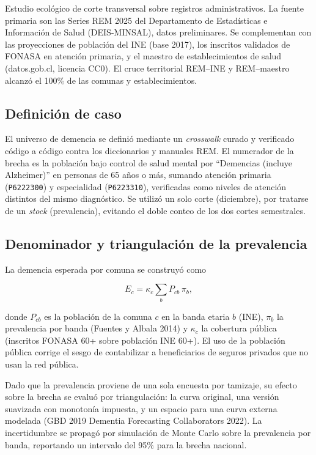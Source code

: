 \documentclass[
  spanish,
  letterpaper,
  DIV=11,
  numbers=noendperiod]{scrartcl}
\begin{document}
Estudio ecológico de corte transversal sobre registros administrativos.
La fuente primaria son las Series REM 2025 del Departamento de
Estadísticas e Información de Salud (DEIS-MINSAL), datos preliminares.
Se complementan con las proyecciones de población del INE (base 2017),
los inscritos validados de FONASA en atención primaria, y el maestro de
establecimientos de salud (datos.gob.cl, licencia CC0). El cruce
territorial REM--INE y REM--maestro alcanzó el 100\% de las comunas y
establecimientos.

\subsection{Definición de caso}\label{definiciuxf3n-de-caso}

El universo de demencia se definió mediante un \emph{crosswalk} curado y
verificado código a código contra los diccionarios y manuales REM. El
numerador de la brecha es la población bajo control de salud mental por
``Demencias (incluye Alzheimer)'' en personas de 65 años o más, sumando
atención primaria (\texttt{P6222300}) y especialidad
(\texttt{P6223310}), verificadas como niveles de atención distintos del
mismo diagnóstico. Se utilizó un solo corte (diciembre), por tratarse de
un \emph{stock} (prevalencia), evitando el doble conteo de los dos
cortes semestrales.

\subsection{Denominador y triangulación de la
prevalencia}\label{denominador-y-triangulaciuxf3n-de-la-prevalencia}

La demencia esperada por comuna se construyó como

\[E_c = \kappa_c \sum_b P_{cb}\,\pi_b,\]

donde \(P_{cb}\) es la población de la comuna \(c\) en la banda etaria
\(b\) (INE), \(\pi_b\) la prevalencia por banda (Fuentes y Albala 2014)
y \(\kappa_c\) la cobertura pública (inscritos FONASA 60+ sobre
población INE 60+). El uso de la población pública corrige el sesgo de
contabilizar a beneficiarios de seguros privados que no usan la red
pública.

Dado que la prevalencia proviene de una sola encuesta por tamizaje, su
efecto sobre la brecha se evaluó por triangulación: la curva original,
una versión suavizada con monotonía impuesta, y un espacio para una
curva externa modelada (GBD 2019 Dementia Forecasting Collaborators
2022). La incertidumbre se propagó por simulación de Monte Carlo sobre
la prevalencia por banda, reportando un intervalo del 95\% para la
brecha nacional.
\end{document}
